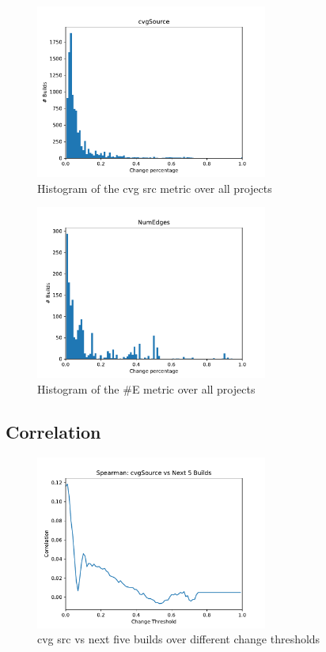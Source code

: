 \documentclass[conference]{IEEEtran}
\begin{document}
\begin{figure}
	\centering
	\includegraphics[width=3in]{assets/cvgSource.pdf}
	\caption{Histogram of the cvg src metric over all projects}
	\label{cvgHist}
\end{figure}

\begin{figure}
	\centering
	\includegraphics[width=3in]{assets/NumEdges.pdf}
	\caption{Histogram of the \#E metric over all projects}
	\label{numEdgesHist}
\end{figure}

\subsection{Correlation}

\begin{figure}
\centering
\includegraphics[width=3in]{assets/cvgSourceCorrPlot}
\caption{cvg src vs next five builds over different change thresholds }
\label{cvgPlot}
\end{figure}
\end{document}
